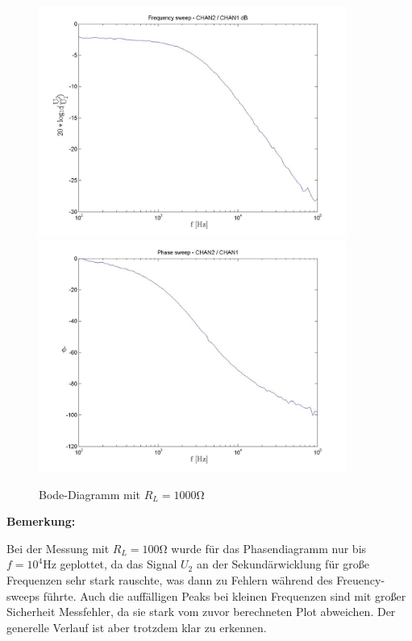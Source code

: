 \documentclass[10pt]{scrreprt}
\begin{document}
\begin{center}
            \begin{figure}[H]
                \centering
                \includegraphics[width=0.9\textwidth]{SchweepeeSchweepVpp_1000Ohm_frequencysweep_ylogxlog.jpg}
                \includegraphics[width=0.9\textwidth]{1000OhmFreundlich_phasesweep_xlog.jpg}
                \caption{Bode-Diagramm mit $R_L = 1000\si{\ohm}$}
            \end{figure}
        \end{center}

        \textbf{Bemerkung:}

        Bei der Messung mit $R_L = 100\si{\ohm}$ wurde für das Phasendiagramm nur
        bis $f = 10^4\si{\hertz}$ geplottet, da das Signal $U_2$ an der Sekundärwicklung
        für große Frequenzen sehr stark rauschte, was dann zu Fehlern während des
        Freuency-sweeps führte. Auch die auffälligen Peaks bei kleinen Frequenzen
        sind mit großer Sicherheit Messfehler, da sie stark vom zuvor berechneten
        Plot abweichen. Der generelle Verlauf ist aber trotzdem klar zu erkennen.
\end{document}
